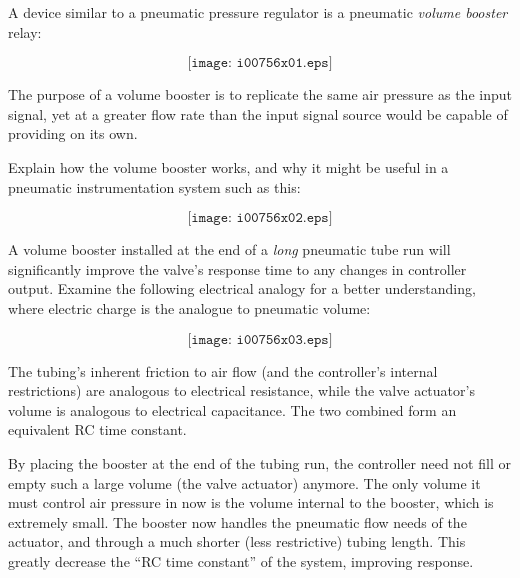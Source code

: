

A device similar to a pneumatic pressure regulator is a pneumatic {\it volume booster} relay:

$$\texttt{[image: i00756x01.eps]}$$

The purpose of a volume booster is to replicate the same air pressure as the input signal, yet at a greater flow rate than the input signal source would be capable of providing on its own.

Explain how the volume booster works, and why it might be useful in a pneumatic instrumentation system such as this:

$$\texttt{[image: i00756x02.eps]}$$







A volume booster installed at the end of a {\it long} pneumatic tube run will significantly improve the valve's response time to any changes in controller output.  Examine the following electrical analogy for a better understanding, where electric charge is the analogue to pneumatic volume:

$$\texttt{[image: i00756x03.eps]}$$

The tubing's inherent friction to air flow (and the controller's internal restrictions) are analogous to electrical resistance, while the valve actuator's volume is analogous to electrical capacitance.  The two combined form an equivalent RC time constant.

By placing the booster at the end of the tubing run, the controller need not fill or empty such a large volume (the valve actuator) anymore.  The only volume it must control air pressure in now is the volume internal to the booster, which is extremely small.  The booster now handles the pneumatic flow needs of the actuator, and through a much shorter (less restrictive) tubing length.  This greatly decrease the ``RC time constant'' of the system, improving response.











